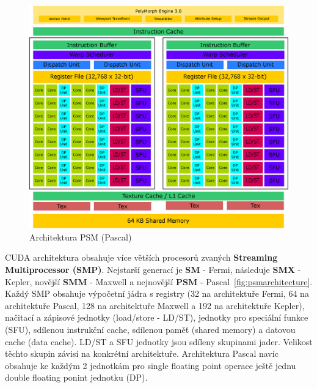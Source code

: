 \begin{figure}[h]
\centering
  \includegraphics[width=1.0\linewidth]{img/PSMArchitecture.eps}
  \caption{Architektura PSM (Pascal)}
  \label{fig:psmarchitecture}
\end{figure}

CUDA architektura obsahuje více větších procesorů zvaných \textbf{Streaming Multiprocessor (SMP)}. Nejstarší generací je \textbf{SM} - Fermi, následuje \textbf{SMX} - Kepler, novější \textbf{SMM} - Maxwell a nejnovější \textbf{PSM} - Pascal~\autoref{fig:psmarchitecture}. Každý SMP obsahuje výpočetní jádra s registry (32 na architektuře Fermi, 64 na architektuře Pascal, 128 na architektuře Maxwell a 192 na architektuře Kepler), načitací a zápisové jednotky (load/store - LD/ST), jednotky pro speciální funkce (SFU), sdílenou instrukční cache, sdílenou paměť (shared memory) a datovou cache (data cache). LD/ST a SFU jednotky jsou sdíleny skupinami jader. Velikost těchto skupin závisí na konkrétní architektuře. Architektura Pascal navíc obsahuje ke každým 2 jednotkám pro single floating point operace ještě jednu double floating ponint jednotku (DP).\\

